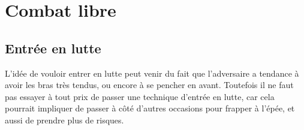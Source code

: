 \chapter{Combat libre}

\cite{boorman:hemac:applied_combatives:2014}

\section{Entrée en lutte}

L'idée de vouloir entrer en lutte peut venir du fait que l'adversaire a tendance à avoir les bras très tendus, ou encore à se pencher en avant.
Toutefois il ne faut pas essayer à tout prix de passer une technique d'entrée en lutte, car cela pourrait impliquer de passer à côté d'autres occasions pour frapper à l'épée, et aussi de prendre plus de risques.
